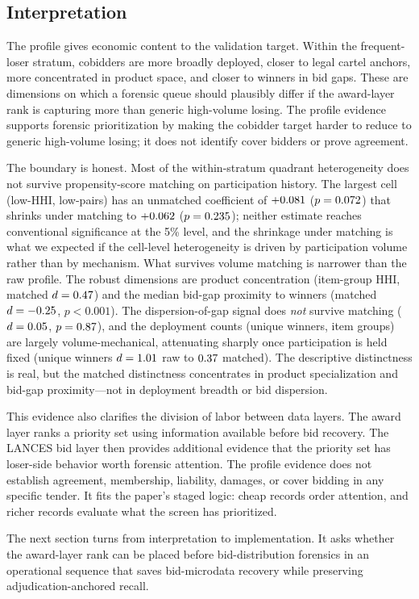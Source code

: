 \subsection{Interpretation}
\label{sec:cobidder_interpretation}

The profile gives economic content to the validation target.
Within the frequent-loser stratum, cobidders are more broadly
deployed, closer to legal cartel anchors, more concentrated in
product space, and closer to winners in bid gaps. These are
dimensions on which a forensic queue should plausibly differ if
the award-layer rank is capturing more than generic high-volume
losing.
The profile evidence supports forensic prioritization by making
the cobidder target harder to reduce to generic high-volume
losing; it does not identify cover bidders or prove agreement.

The boundary is honest. Most of the within-stratum quadrant
heterogeneity does not survive propensity-score matching on
participation history. The largest cell (low-HHI, low-pairs)
has an unmatched coefficient of $+0.081$
($p=0.072$) that shrinks under matching to
$+0.062$ ($p=0.235$); neither
estimate reaches conventional significance at the 5\% level, and the
shrinkage under matching is what we expected if the cell-level
heterogeneity is driven by participation volume rather than by
mechanism.
What survives volume matching is narrower than the raw profile.
The robust dimensions are product concentration (item-group HHI,
matched $d=0.47$) and the median bid-gap proximity to
winners (matched $d=-0.25$, $p<0.001$). The
dispersion-of-gap signal does \emph{not} survive matching
($d=0.05$, $p=0.87$), and the deployment
counts (unique winners, item groups) are largely
volume-mechanical, attenuating sharply once participation is held
fixed (unique winners $d=1.01$ raw to
$0.37$ matched). The descriptive distinctness is
real, but the matched distinctness concentrates in product
specialization and bid-gap proximity---not in deployment breadth
or bid dispersion.

This evidence also clarifies the division of labor between data
layers. The award layer ranks a priority set using
information available before bid recovery. The LANCES bid layer
then provides additional evidence that the priority set has
loser-side behavior worth forensic attention. The profile
evidence does not establish
agreement, membership, liability, damages, or cover bidding in
any specific tender. It fits the paper's staged logic: cheap
records order attention, and richer records evaluate what the
screen has prioritized.

The next section turns from interpretation to implementation. It
asks whether the award-layer rank can be placed before
bid-distribution forensics in an operational sequence that saves
bid-microdata recovery while preserving adjudication-anchored
recall.
